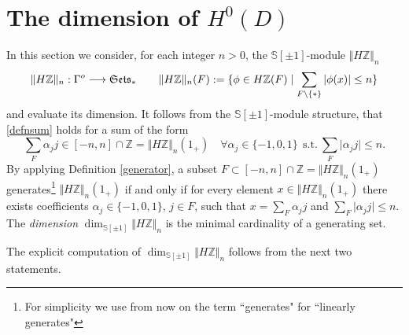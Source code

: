 \documentclass[cupthm]{CUP-JNL-JMJ}
\numberwithin{equation}{section}
\theoremstyle{cupplain}
\theoremstyle{cupdefinition}
\theoremstyle{cupremark}
\theoremstyle{cupproof}
\def\S{{\mathbb S}}
\def\Z{{\mathbb Z}}
\def\sss{{\S}}
\def\spm{{\sss[\pm 1]}}
\def\Se{\frak{ Sets}}
\begin{document}
\section{The dimension of $H^0(D)$}\label{sec3}
  
In this section we consider, for each integer $n>0$, the $\spm$-module $\Vert H\Z\Vert_n$ 
\[
\| H\Z\|_{n}: \Gamma^{o}\longrightarrow \Se_*\qquad \| H\Z\|_{n}(F):=\{\phi\in H\Z(F)\mid \sum_{F\setminus \{*\}} \vert\phi(x)\vert\leq n\}
\]
and evaluate its dimension.  It follows from the $\spm$-module structure, that \eqref{defnsum} holds for a sum of the form 
\[
\sum_F \alpha_j j\in [-n,n]\cap \Z=\Vert H\Z\Vert_n(1_+) \quad \forall \alpha_j\in \{-1,0,1\}~~\text{s.t.}~ \sum_F \vert \alpha_j j\vert \leq n.
\]
By applying Definition \ref{generator}, 	a subset $F\subset [-n,n]\cap \Z=\Vert H\Z\Vert_n(1_+)$ generates\footnote{For simplicity we use from now on the term ``generates" for ``linearly generates"} $\Vert H\Z\Vert_n(1_+)$ if and only if for every element  $x\in \Vert H\Z\Vert_n(1_+)$ there exists coefficients $\alpha_j\in \{-1,0,1\}$, $j\in F$, such that $x=\sum_F \alpha_j j$ and $\sum_F \vert \alpha_j j\vert \leq n$. The {\em dimension} $\dim_{\spm}\Vert H\Z\Vert_n$ is the minimal cardinality of a generating set.
	
The explicit computation of  $\dim_{\spm}\Vert H\Z\Vert_n$ follows from the next two statements.
	
\end{document}
